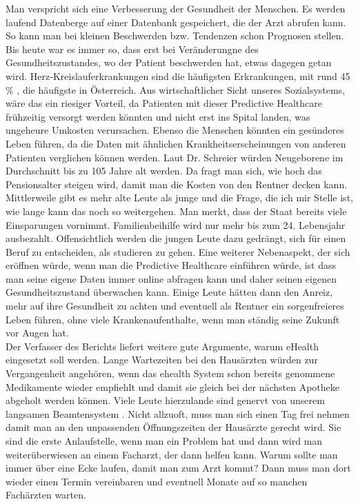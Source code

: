 \documentclass[journal]{IEEEtran}
\begin{document}
Man verspricht sich eine Verbesserung der Gesundheit der Menschen. Es werden laufend Datenberge
auf einer Datenbank gespeichert, die der Arzt abrufen kann. So kann man bei kleinen Beschwerden bzw. 
Tendenzen schon Prognosen stellen. Bis heute war es immer so, dass erst bei Veränderungne des Gesundheitszustandes, wo der Patient beschwerden hat, etwas dagegen getan wird. Herz-Kreislauferkrankungen sind die häufigsten Erkrankungen, mit rund 45$\%$ \cite{bmv:herz}, die häufigste in Österreich.
Aus wirtschaftlicher Sicht unseres Sozialsystems, wäre das ein riesiger Vorteil, da Patienten 
mit dieser Predictive Healthcare frühzeitig versorgt werden könnten und nicht erst ins Spital 
landen, was ungeheure Umkosten verursachen. Ebenso die Menschen könnten ein gesünderes Leben führen, da die Daten mit ähnlichen Krankheitserscheinungen von anderen Patienten verglichen können werden. 
Laut Dr. Schreier \cite{schreier:ehealth} würden Neugeborene im Durchschnitt bis zu 105 Jahre alt werden.
Da fragt man sich, wie hoch das Pensionsalter steigen wird, damit man die Kosten von den Rentner decken kann. Mittlerweile gibt es mehr alte Leute als junge und die Frage, die ich mir Stelle ist, wie lange kann das noch so weitergehen. Man merkt, dass der Staat bereits viele Einsparungen vornimmt. Familienbeihilfe wird nur mehr bis zum 24. Lebensjahr \cite{help:gv} ausbezahlt. Offensichtlich werden 
die jungen Leute dazu gedrängt, sich für einen Beruf zu entscheiden, als studieren zu gehen. 
Eine weiterer Nebenaspekt, der sich eröffnen würde, wenn man die Predictive Healthcare einführen würde, ist dass man seine eigene Daten immer online abfragen kann und daher seinen eigenen Gesundheitszustand überwachen kann. Einige Leute hätten dann den Anreiz, mehr auf ihre Gesundheit zu achten und eventuell als Rentner ein sorgenfreieres Leben führen, ohne viele Krankenaufenthalte, wenn man
ständig seine Zukunft vor Augen hat. \\


Der Verfasser des Berichts liefert weitere gute Argumente, warum eHealth eingesetzt soll werden. 
Lange Wartezeiten bei den Hausärzten würden zur Vergangenheit angehören, wenn das ehealth System 
schon bereits genommene Medikamente wieder empfiehlt und damit sie gleich bei der nächsten Apotheke abgeholt werden können. Viele Leute hierzulande sind genervt von unserem langsamen Beamtensystem \cite{buerokratie:asterix}. 
Nicht allzuoft, muss man sich einen Tag frei nehmen damit man an den unpassenden Öffnungszeiten der Hausärzte gerecht wird. Sie sind die erste Anlaufstelle, wenn man ein Problem hat und dann wird man weiterüberwiesen an einem Facharzt, der dann helfen kann. Warum sollte man immer über eine Ecke laufen, 
damit man zum Arzt kommt? Dann muss man dort wieder einen Termin vereinbaren und eventuell Monate auf 
so manchen Fachärzten warten. \\
\end{document}
